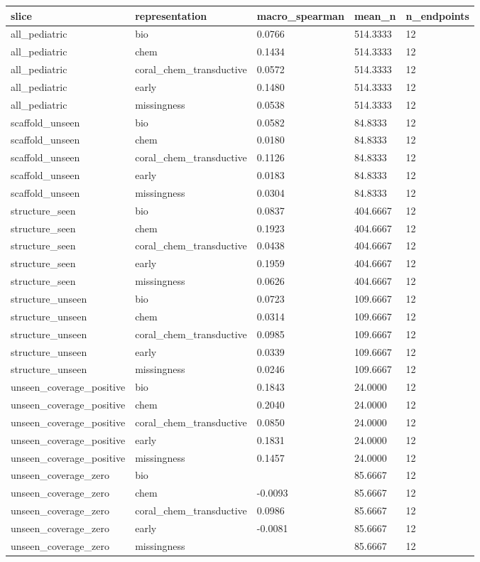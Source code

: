 \begin{tabular}{lllll}
\hline
slice & representation & macro\_spearman & mean\_n & n\_endpoints \\
\hline
all\_pediatric & bio & 0.0766 & 514.3333 & 12 \\
all\_pediatric & chem & 0.1434 & 514.3333 & 12 \\
all\_pediatric & coral\_chem\_transductive & 0.0572 & 514.3333 & 12 \\
all\_pediatric & early & 0.1480 & 514.3333 & 12 \\
all\_pediatric & missingness & 0.0538 & 514.3333 & 12 \\
scaffold\_unseen & bio & 0.0582 & 84.8333 & 12 \\
scaffold\_unseen & chem & 0.0180 & 84.8333 & 12 \\
scaffold\_unseen & coral\_chem\_transductive & 0.1126 & 84.8333 & 12 \\
scaffold\_unseen & early & 0.0183 & 84.8333 & 12 \\
scaffold\_unseen & missingness & 0.0304 & 84.8333 & 12 \\
structure\_seen & bio & 0.0837 & 404.6667 & 12 \\
structure\_seen & chem & 0.1923 & 404.6667 & 12 \\
structure\_seen & coral\_chem\_transductive & 0.0438 & 404.6667 & 12 \\
structure\_seen & early & 0.1959 & 404.6667 & 12 \\
structure\_seen & missingness & 0.0626 & 404.6667 & 12 \\
structure\_unseen & bio & 0.0723 & 109.6667 & 12 \\
structure\_unseen & chem & 0.0314 & 109.6667 & 12 \\
structure\_unseen & coral\_chem\_transductive & 0.0985 & 109.6667 & 12 \\
structure\_unseen & early & 0.0339 & 109.6667 & 12 \\
structure\_unseen & missingness & 0.0246 & 109.6667 & 12 \\
unseen\_coverage\_positive & bio & 0.1843 & 24.0000 & 12 \\
unseen\_coverage\_positive & chem & 0.2040 & 24.0000 & 12 \\
unseen\_coverage\_positive & coral\_chem\_transductive & 0.0850 & 24.0000 & 12 \\
unseen\_coverage\_positive & early & 0.1831 & 24.0000 & 12 \\
unseen\_coverage\_positive & missingness & 0.1457 & 24.0000 & 12 \\
unseen\_coverage\_zero & bio &  & 85.6667 & 12 \\
unseen\_coverage\_zero & chem & -0.0093 & 85.6667 & 12 \\
unseen\_coverage\_zero & coral\_chem\_transductive & 0.0986 & 85.6667 & 12 \\
unseen\_coverage\_zero & early & -0.0081 & 85.6667 & 12 \\
unseen\_coverage\_zero & missingness &  & 85.6667 & 12 \\
\hline
\end{tabular}
